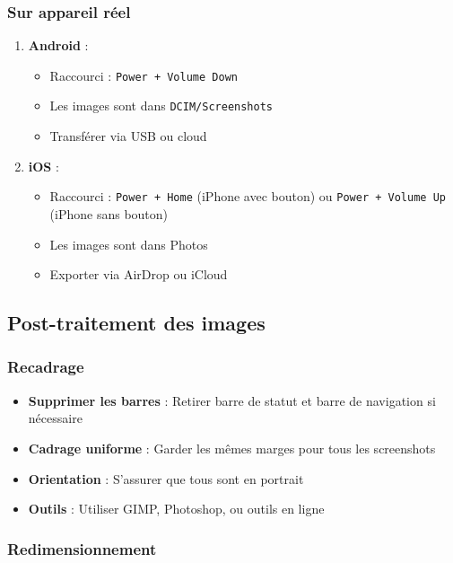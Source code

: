 \documentclass[a4paper,11pt]{report}
\begin{document}
\subsubsection{Sur appareil réel}

\begin{enumerate}
    \item \textbf{Android} :
    \begin{itemize}
        \item Raccourci : \texttt{Power + Volume Down}
        \item Les images sont dans \texttt{DCIM/Screenshots}
        \item Transférer via USB ou cloud
    \end{itemize}
    
    \item \textbf{iOS} :
    \begin{itemize}
        \item Raccourci : \texttt{Power + Home} (iPhone avec bouton) ou \texttt{Power + Volume Up} (iPhone sans bouton)
        \item Les images sont dans Photos
        \item Exporter via AirDrop ou iCloud
    \end{itemize}
\end{enumerate}

\subsection{Post-traitement des images}

\subsubsection{Recadrage}

\begin{itemize}
    \item \textbf{Supprimer les barres} : Retirer barre de statut et barre de navigation si nécessaire
    \item \textbf{Cadrage uniforme} : Garder les mêmes marges pour tous les screenshots
    \item \textbf{Orientation} : S'assurer que tous sont en portrait
    \item \textbf{Outils} : Utiliser GIMP, Photoshop, ou outils en ligne
\end{itemize}

\subsubsection{Redimensionnement}
\end{document}
